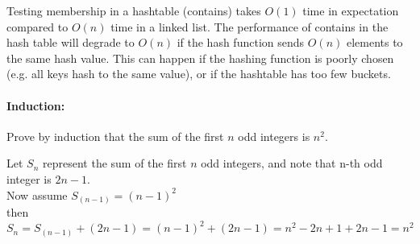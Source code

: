 \documentclass[12pt,twoside]{article}
\begin{document}
{\color{red}
Testing membership in a hashtable (contains) takes $O(1)$ time in expectation compared to $O(n)$ time in a linked list. The performance of contains in the hash table will degrade to $O(n)$ if the hash function sends $O(n)$ elements to the same hash value. This can happen if the hashing function is poorly chosen (e.g. all keys hash to the same value), or if the hashtable has too few buckets.
}

\paragraph{Induction:} Prove by induction that the sum of the first $n$ odd integers is $n^2$.

{
	\color{red}

Let $S_n$ represent the sum of the first $n$ odd integers, and note that n-th odd integer is $2n-1$.\\

	Now assume $S_{(n-1)} = (n - 1)^2$\\
	then $S_n =S_{(n-1)}+(2n-1)=(n-1)^2+(2n-1)=n^2-2n+1+2n-1=n^2$

}
\end{document}

